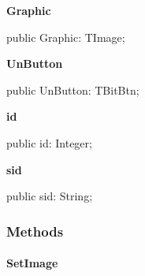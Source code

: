 \documentclass{report}
\newif\ifpdf
\begin{document}
\begin{list}{}
\begin{flushleft}
\ifpdf
\end{flushleft}
\fi


\par  \label{utilities.TListEntry-Graphic}
\item[\textbf{Graphic}\hfill]
\ifpdf
\begin{flushleft}
\fi
\begin{ttfamily}
public Graphic: TImage;\end{ttfamily}

\ifpdf
\end{flushleft}
\fi


\par  \label{utilities.TListEntry-UnButton}
\item[\textbf{UnButton}\hfill]
\ifpdf
\begin{flushleft}
\fi
\begin{ttfamily}
public UnButton: TBitBtn;\end{ttfamily}

\ifpdf
\end{flushleft}
\fi


\par  \label{utilities.TListEntry-id}
\item[\textbf{id}\hfill]
\ifpdf
\begin{flushleft}
\fi
\begin{ttfamily}
public id: Integer;\end{ttfamily}

\ifpdf
\end{flushleft}
\fi


\par  \label{utilities.TListEntry-sid}
\item[\textbf{sid}\hfill]
\ifpdf
\begin{flushleft}
\fi
\begin{ttfamily}
public sid: String;\end{ttfamily}

\ifpdf
\end{flushleft}
\fi


\par  \end{list}
\subsubsection*{\large{\textbf{Methods}}\normalsize\hspace{1ex}\hfill}
\paragraph*{SetImage}\hspace*{\fill}
\end{document}
